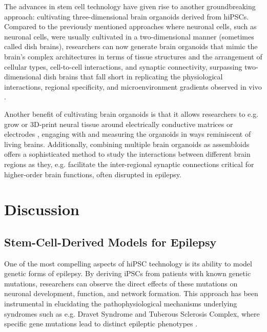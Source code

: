 \documentclass[10pt]{article}
\begin{document}
\begin{sloppypar}
  The advances in stem cell technology have given rise to another groundbreaking approach: cultivating three-dimensional brain organoids derived from hiPSCs. Compared to the previously mentioned approaches where neuronal cells, such as neuronal cells, were usually cultivated in a two-dimensional manner (sometimes called dish brains), researchers can now generate brain organoids that mimic the brain’s complex architectures in terms of tissue structures and the arrangement of cellular types, cell-to-cell interactions, and synaptic connectivity, surpassing two-dimensional dish brains that fall short in replicating the physiological interactions, regional specificity, and microenvironment gradients observed in vivo \citep{clevers_modeling_2016, wang_modeling_2018}.

  Another benefit of cultivating brain organoids is that it allows researchers to e.g. grow or 3D-print neural tissue around electrically conductive matrices or electrodes \citep{yao_3d_2023}, engaging with and measuring the organoids in ways reminiscent of living brains. Additionally, combining multiple brain organoids as assembloids offers a sophisticated method to study the interactions between different brain regions \citep{sloan_generation_2018} as they, e.g. facilitate the inter-regional synaptic connections critical for higher-order brain functions, often disrupted in epilepsy.

  \section{Discussion}
  \label{sec:discussion}


  \subsection{Stem-Cell-Derived Models for Epilepsy}
  \label{sec:stem-cell-derived-models-for-epilepsy}

  One of the most compelling aspects of hiPSC technology is its ability to model genetic forms of epilepsy. By deriving iPSCs from patients with known genetic mutations, researchers can observe the direct effects of these mutations on neuronal development, function, and network formation. This approach has been instrumental in elucidating the pathophysiological mechanisms underlying syndromes such as e.g. Dravet Syndrome and Tuberous Sclerosis Complex, where specific gene mutations lead to distinct epileptic phenotypes \citep{jiao_modeling_2013, nadadhur_neuron-glia_2019}.


\end{sloppypar}
\end{document}
